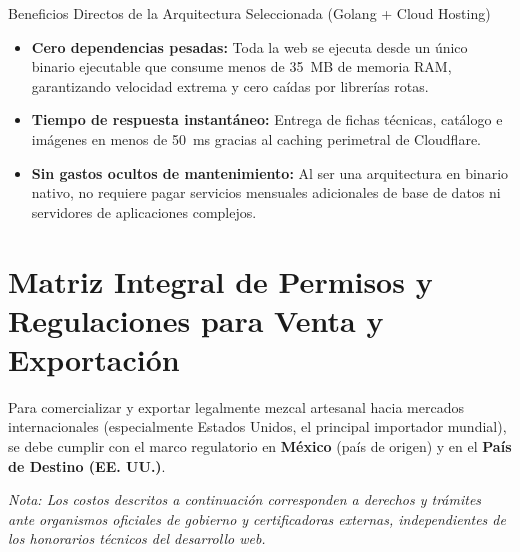 \documentclass[11pt,letterpaper]{article}
\begin{document}
\vspace{0.25cm}

\begin{infobox}{Beneficios Directos de la Arquitectura Seleccionada (Golang + Cloud Hosting)}
\footnotesize
\begin{itemize}[leftmargin=0.9cm,topsep=1.5pt,itemsep=2pt]
    \item \textbf{Cero dependencias pesadas:} Toda la web se ejecuta desde un único binario ejecutable que consume menos de 35~MB de memoria RAM, garantizando velocidad extrema y cero caídas por librerías rotas.
    \item \textbf{Tiempo de respuesta instantáneo:} Entrega de fichas técnicas, catálogo e imágenes en menos de 50~ms gracias al caching perimetral de Cloudflare.
    \item \textbf{Sin gastos ocultos de mantenimiento:} Al ser una arquitectura en binario nativo, no requiere pagar servicios mensuales adicionales de base de datos ni servidores de aplicaciones complejos.
\end{itemize}
\end{infobox}

\clearpage

\section{Matriz Integral de Permisos y Regulaciones para Venta y Exportación}

Para comercializar y exportar legalmente mezcal artesanal hacia mercados internacionales (especialmente Estados Unidos, el principal importador mundial), se debe cumplir con el marco regulatorio en \textbf{México} (país de origen) y en el \textbf{País de Destino (EE. UU.)}. 

\textit{Nota: Los costos descritos a continuación corresponden a derechos y trámites ante organismos oficiales de gobierno y certificadoras externas, independientes de los honorarios técnicos del desarrollo web.}

\vspace{0.15cm}
\end{document}
